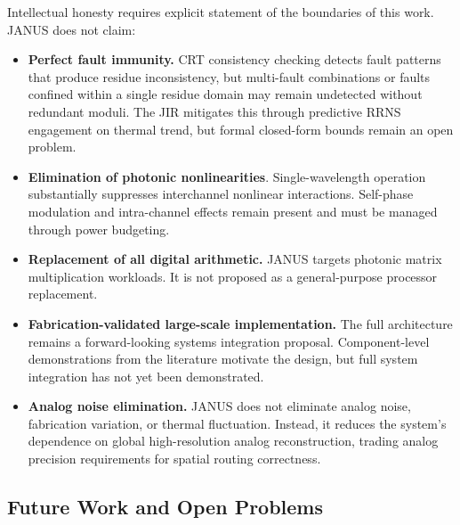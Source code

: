 \documentclass[journal]{IEEEtran}
\begin{document}
Intellectual honesty requires explicit statement of the boundaries of this work. JANUS does not claim:
\begin{itemize}
\item  \textbf{Perfect fault immunity.} CRT consistency checking detects fault patterns that produce residue inconsistency, but multi-fault combinations or faults confined within a single residue domain may remain undetected without redundant moduli. The JIR mitigates this through predictive RRNS engagement on thermal trend, but formal closed-form bounds remain an open problem.
\item  \textbf{Elimination of photonic nonlinearities}. Single-wavelength operation substantially suppresses interchannel nonlinear interactions. Self-phase modulation and intra-channel effects remain present and must be managed through power budgeting.
\item  \textbf{Replacement of all digital arithmetic.} JANUS targets photonic matrix multiplication workloads. It is not proposed as a general-purpose processor replacement.
\item  \textbf{Fabrication-validated large-scale implementation.} The full architecture remains a forward-looking systems integration proposal. Component-level demonstrations from the literature motivate the design, but full system integration has not yet been demonstrated.
\item  \textbf{Analog noise elimination.} JANUS does not eliminate analog noise, fabrication variation, or thermal fluctuation. Instead, it reduces the system’s dependence on global high-resolution analog reconstruction, trading analog precision requirements for spatial routing correctness.
\end{itemize}

\subsection{\textbf{Future Work and Open Problems}}
\end{document}
